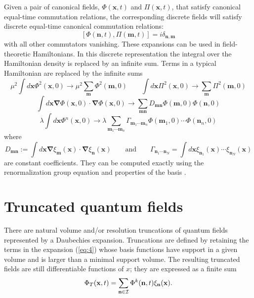 \documentclass[aps,prc,reprint,showpacs,groupedaddress,onecolumn]{revtex4}
\def\beq{\begin{equation}}
\def\eeq{\end{equation}}
\begin{document}
Given a pair of canonical fields, $ \Phi (\mathbf{x},t)$ and 
$\Pi (\mathbf{x},t)$, that satisfy canonical equal-time 
commutation relations,  the corresponding discrete fields will satisfy 
discrete equal-time canonical commutation relations: 
%
%
%
\[
[\Phi (\mathbf{n},t), \Pi (\mathbf{m},t)]=
i \delta_{\mathbf{n},\mathbf{m}}
\]
with all other commutators vanishing.  
These expansions can be used in field-theoretic Hamiltonians.  In this
discrete representation the integral over the Hamiltonian density is
replaced by an infinite sum.  Terms in a typical Hamiltonian are
replaced by the infinite sums
\[
\mu^2 \int d\mathbf{x} \Phi^2(\mathbf{x},0) \to 
\mu^2 \sum_{\mathbf{m}}  \Phi^2(\mathbf{m},0)  
\qquad
\int d\mathbf{x} \Pi^2(\mathbf{x},0) \to 
\sum_{\mathbf{m}}  \Pi^2(\mathbf{m},0)  
\]
\[
\int d\mathbf{x} \pmb{\nabla}\Phi(\mathbf{x},0) \cdot
\pmb{\nabla}\Phi(\mathbf{x},0) \to 
\sum_{\mathbf{m}\mathbf{n}} D_{\mathbf{m}\mathbf{n}} 
\Phi (\mathbf{m},0)\Phi (\mathbf{n},0)
\]
\[
\lambda \int d\mathbf{x} \Phi^n(\mathbf{x},0) 
\to \lambda 
\sum_{\mathbf{m}_1 \cdots \mathbf{m}_n} \Gamma_{\mathbf{m}_1 \cdots \mathbf{m}_n} 
\Phi (\mathbf{m}_1,0) \cdots \Phi (\mathbf{n}_n,0)
\]
where
\beq
D_{\mathbf{m}\mathbf{n}}:=
\int d\mathbf{x} \pmb{\nabla} \xi_{\mathbf{m}} (\mathbf{x}) \cdot \pmb{\nabla} 
\xi_{\mathbf{n}} (\mathbf{x}) 
\qquad
\mbox{and}
\qquad 
\Gamma_{\mathbf{n}_1 \cdots \mathbf{n}_N} =
\int d\mathbf{x}
\xi_{\mathbf{n}_1} (\mathbf{x}) \cdots \xi_{\mathbf{n}_N} (\mathbf{x}) 
\label{eq:5}
\eeq
are constant coefficients.  They can be computed exactly using the 
renormalization group equation and properties of the basis 
\cite{beylkin}\cite{fatih} .

\section{Truncated quantum fields}

There are natural volume and/or resolution truncations of quantum
fields represented by a Daubechies expansion.  Truncations are defined by
retaining the terms in the expansion (\ref{eq:4}) whose basis functions
have support in a given volume and is larger than a minimal support volume.
The resulting truncated fields are still differentiable functions of
$x$; they are expressed as a finite sum
\beq
\Phi_T (\mathbf{x},t) =
\sum_{\mathbf{n}\in {\cal I}} \Phi^k (\mathbf{n},t) \xi_{\mathbf{n}}(\mathbf{x}).   
\label{eq:6}
\eeq
\end{document}
